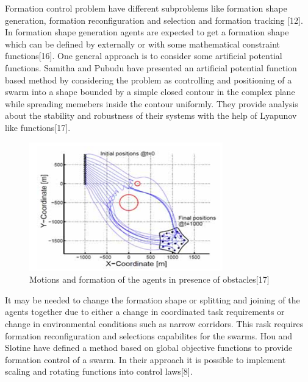 \documentclass[twoside]{article}
\begin{document}
Formation control problem have different subproblems like formation shape generation, formation reconfiguration and selection and formation tracking [12].  
In formation shape generation agents are expected to get a formation shape which can be defined by externally or with some mathematical constraint functions[16].  One general approach is to consider some artificial potential functions. Samitha and Pubudu have presented an artificial potential function based method  by considering the problem as controlling and positioning of a swarm into a shape bounded by a simple closed contour in the complex plane while spreading memebers inside the contour uniformly.  They provide analysis about the stability and robustness of their systems with the help of Lyapunov like functions[17].

	\begin{figure}[H]
		\caption{Motions and formation of the agents in presence of obstacles[17]}
		\centering
		\includegraphics[scale = 1]{samitha}
	\end{figure} 

It may be needed to change the formation shape or splitting and joining of the agents together due to either a change in coordinated task requirements or change in environmental conditions such as narrow corridors.  This rask requires formation reconfiguration and selections capabilites for the swarms. Hou and Slotine have defined a method based on global objective functions to provide formation control of a swarm. In their approach it is possible to implement scaling and rotating functions into control laws[8].
\end{document}
